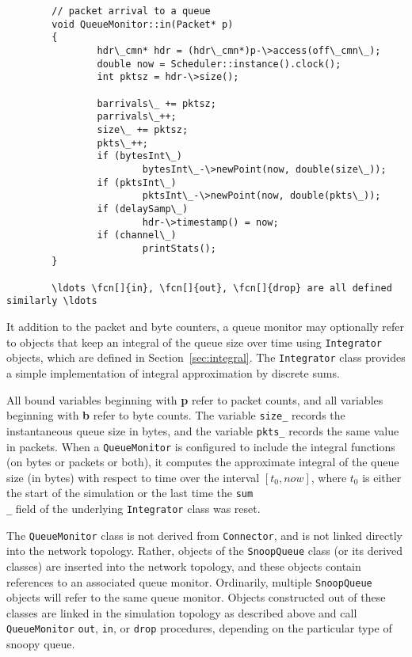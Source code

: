 \begin{verbatim}
        // packet arrival to a queue
        void QueueMonitor::in(Packet* p)
        {
                hdr\_cmn* hdr = (hdr\_cmn*)p-\>access(off\_cmn\_);
                double now = Scheduler::instance().clock();
                int pktsz = hdr-\>size();

                barrivals\_ += pktsz;
                parrivals\_++;
                size\_ += pktsz;
                pkts\_++;
                if (bytesInt\_)
                        bytesInt\_-\>newPoint(now, double(size\_));
                if (pktsInt\_)
                        pktsInt\_-\>newPoint(now, double(pkts\_));
                if (delaySamp\_)
                        hdr-\>timestamp() = now;
                if (channel\_)
                        printStats();
        }

        \ldots \fcn[]{in}, \fcn[]{out}, \fcn[]{drop} are all defined similarly \ldots
\end{verbatim}
It addition to the packet and byte counters, a queue monitor
may optionally refer to objects that keep an integral
of the queue size over time using
{\tt Integrator} objects, which are defined in Section~\ref{sec:integral}.
The {\tt Integrator} class provides a simple implementation of
integral approximation by discrete sums.

All bound variables beginning with {\bf p} refer to packet counts, and
all variables beginning with {\bf b} refer to byte counts.
The variable {\tt size\_} records the instantaneous queue size in bytes,
and the variable {\tt pkts\_} records the same value in packets.
When a {\tt QueueMonitor} is configured to include the integral
functions (on bytes or packets or both), it
computes the approximate integral of the
queue size (in bytes)
with respect to time over the interval $[t_0, now]$, where
$t_0$ is either the start of the simulation or the last time the
{\tt sum\\_} field of the underlying {\tt Integrator} class was reset.

The {\tt QueueMonitor} class is not derived from {\tt Connector}, and
is not linked directly into the network topology.
Rather, objects of the {\tt SnoopQueue} class (or its derived classes)
are inserted into the network topology, and these objects contain references
to an associated queue monitor.
Ordinarily, multiple {\tt SnoopQueue} objects will refer to the same
queue monitor.
Objects constructed out of these classes are linked in the simulation
topology as described above and call {\tt QueueMonitor}
{\tt out}, {\tt in}, or {\tt drop} procedures,
depending on the particular type of snoopy queue.

